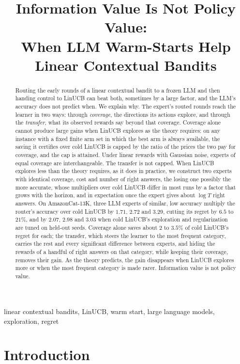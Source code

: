 \documentclass[anon]{alt2027} %
\title[Information Value Is Not Policy Value]{Information Value Is Not Policy Value:\\ When LLM Warm-Starts Help Linear Contextual Bandits}
\begin{document}
\maketitle
\begin{abstract}
Routing the early rounds of a linear contextual bandit to a frozen LLM and
then handing control to LinUCB can beat both, sometimes by a large factor,
and the LLM's accuracy does not predict when. We explain why. The expert's
routed rounds reach the learner in two ways: through \emph{coverage}, the
directions its actions explore, and through the \emph{transfer}, what its
observed rewards say beyond that coverage. Coverage alone cannot produce
large gains when LinUCB explores as the theory requires: on any instance with
a fixed finite arm set in which the best arm is always available, the saving
it certifies over cold LinUCB is capped by the ratio of the prices the two
pay for coverage, and the cap is attained. Under linear rewards with Gaussian
noise, experts of equal coverage are interchangeable. The transfer is not
capped. When LinUCB explores less than the theory requires, as it does in
practice, we construct two experts with identical coverage, cost and number
of right answers, the losing one possibly the more accurate, whose
multipliers over cold LinUCB differ in most runs by a factor that grows with
the horizon, and in expectation once the expert gives about $\log T$ right
answers. On AmazonCat-13K, three LLM experts of similar, low accuracy
multiply the router's accuracy over cold LinUCB by $1.71$, $2.72$ and $3.29$,
cutting its regret by $6.5$ to $21\%$, and by $2.07$, $2.98$ and $3.03$ when
cold LinUCB's exploration and regularization are tuned on held-out seeds.
Coverage alone saves about $2$ to
$3.5\%$ of cold LinUCB's regret for each; the transfer, which steers the
learner to the most frequent category, carries the rest and every
significant difference between experts, and hiding the rewards of a handful
of right answers on that category, while keeping their coverage, removes
their gain. As the theory predicts, the gain disappears when LinUCB explores
more or when the most frequent category is made rarer. Information value is
not policy value.
\end{abstract}

\begin{keywords}%
linear contextual bandits, LinUCB, warm start, large language models, exploration, regret
\end{keywords}


\section{Introduction}
\label{sec:intro}
\end{document}
